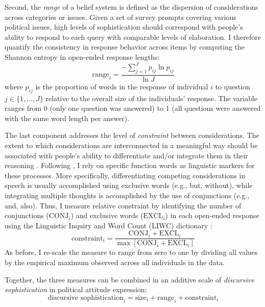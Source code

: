 Second, the \textit{range} of a belief system is defined as the dispersion of considerations across categories or issues. Given a set of survey prompts covering various political issues, high levels of sophistication should correspond with people's ability to respond to each query with comparable levels of elaboration. I therefore quantify the consistency in response behavior across items by computing the Shannon entropy in open-ended response lengths:
\begin{equation}
\text{range}_i = \dfrac{-\sum_{j=1}^J p_{ij} \ln p_{ij}}{\ln J}
\end{equation}
where $p_{ij}$ is the proportion of words in the response of individual $i$ to question $j\in \{1,...,J\}$ relative to the overall size of the individuals' response. The variable ranges from 0 (only one question was answered) to 1 (all questions were answered with the same word length per answer).

The last component addresses the level of \textit{constraint} between considerations. The extent to which considerations are interconnected in a meaningful way should be associated with people's ability to differentiate and/or integrate them in their reasoning \citep{tetlock1993cognitive}. Following \citet{tausczik2010psychological}, I rely on specific function words as linguistic markers for these processes. More specifically, differentiating competing considerations in speech is usually accomplished using exclusive words (e.g., but, without), while integrating multiple thoughts is accomplished by the use of conjunctions (e.g., and, also). Thus, I measure relative constraint by identifying the number of conjunctions ($\text{CONJ}_i$) and exclusive words ($\text{EXCL}_i$) in each open-ended response using the Linguistic Inquiry and Word Count (LIWC) dictionary \citep{pennebaker2015development}:
\begin{equation}
\text{constraint}_i = \dfrac{\text{CONJ}_i + \text{EXCL}_i}{\max\left[\text{CONJ}_i + \text{EXCL}_i\right]}
\end{equation}
As before, I re-scale the measure to range from zero to one by dividing all values by the empirical maximum observed across all individuals in the data.

Together, the three measures can be combined in an additive scale of \textit{discursive sophistication} in political attitude expression:
\begin{equation}
\text{discursive sophistication}_i = \text{size}_i + \text{range}_i + \text{constraint}_i
\end{equation}

